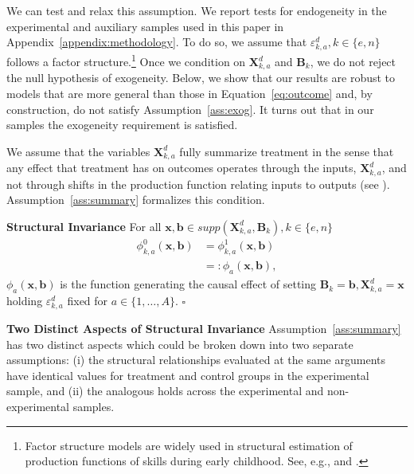 We can test and relax this assumption. We report tests for endogeneity in the experimental and auxiliary samples used in this paper in Appendix~\ref{appendix:methodology}. To do so, we assume that $\varepsilon_{k,a}^d, k \in \{e,n\}$ follows a factor structure.\footnote{Factor structure models are widely used in structural estimation of production functions of skills during early childhood. See, e.g., \citet{Cunha_Heckman_2008_JHR} and \citet{Cunha_Heckman_etal_2010_est_tech_cognoncog}.} Once we condition on $\bm{X}_{k,a}^d$ and $\bm{B}_{k}$, we do not reject the null hypothesis of exogeneity. Below, we show that our results are robust to models that are more general than those in Equation~\eqref{eq:outcome} and, by construction, do not satisfy Assumption~\ref{ass:exog}. It turns out that in our samples the exogeneity requirement is satisfied.

We assume that the variables $\bm{X}_{k,a}^d$ fully summarize treatment in the sense that any effect that treatment has on outcomes operates through the inputs, $\bm{X}_{k,a}^d$, and not through shifts in the production function relating inputs to outputs (see \citealp{Heckman_Pinto_etal_2013_PerryFactor}). Assumption~\ref{ass:summary} formalizes this condition.

\onehalfspacing
\begin{assumption} \label{ass:summary} \textbf{Structural Invariance}
For all $\bm{x}, \bm{b} \in supp(\bm{X}^d_{k,a}, \bm{B}_k), k \in \{e,n\}$
\begin{align}
\phi_{k,a}^0 \left( \bm{x}, \bm{b} \right) &= \phi_{k,a}^1 (\bm{x}, \bm{b}) \\   \nonumber                                                                     &=: \phi_{a} (\bm{x}, \bm{b}),
\end{align}
$\phi_{a}(\bm{x}, \bm{b})$ is the function generating the causal effect of setting $ \bm{B}_k=\bm{b}, \bm{X}^d_{k,a}=\bm{x}$ holding $\varepsilon^d_{k,a}$ fixed for $a \in \{1,\dots,A\}$. $\square$
\end{assumption}

\begin{remark} \textbf{Two Distinct Aspects of Structural Invariance}
Assumption~\ref{ass:summary} has two distinct aspects which could be broken down into two separate assumptions: (i) the structural relationships evaluated at the same arguments have identical values for treatment and control groups in the experimental sample, and (ii) the analogous holds across the experimental and non-experimental samples. 
\end{remark}

